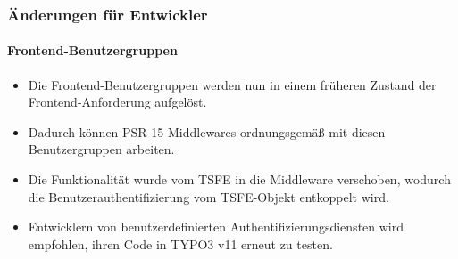 %

\begin{frame}[fragile]
	\frametitle{Änderungen für Entwickler}
	\framesubtitle{Frontend-Benutzergruppen}


	\begin{itemize}
		\item Die Frontend-Benutzergruppen werden nun in einem früheren Zustand
			der Frontend-Anforderung aufgelöst.
		\item Dadurch können PSR-15-Middlewares ordnungsgemäß mit diesen Benutzergruppen arbeiten.
		\item Die Funktionalität wurde vom TSFE in die Middleware verschoben,
			wodurch die Benutzerauthentifizierung vom TSFE-Objekt entkoppelt wird.
		\item Entwicklern von benutzerdefinierten Authentifizierungsdiensten wird empfohlen,
			ihren Code in TYPO3 v11 erneut zu testen.
	\end{itemize}

\end{frame}

